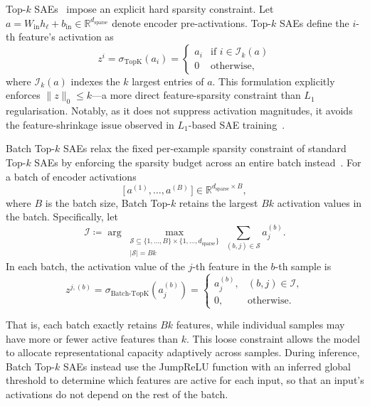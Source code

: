 \begin{definitionbox}
Top-$k$ SAEs~ impose an explicit hard sparsity constraint. Let $a = W_{\text{in}} h_\ell + b_{\text{in}} \in \mathbb{R}^{d_{\text{sparse}}}$ denote encoder pre-activations. Top-$k$ SAEs define the $i$-th feature's activation as
\[
z^i = \sigma_{\text{TopK}}(a_i) = \begin{cases}
a_i & \text{if } i \in \mathcal{I}_k(a) \\
0 & \text{otherwise},
\end{cases}
\]
where $\mathcal{I}_k(a)$ indexes the $k$ largest entries of $a$. This formulation explicitly enforces $\|z\|_0 \le k$---a more direct feature-sparsity constraint than $L_1$ regularisation. Notably, as it does not suppress activation magnitudes, it avoids the feature-shrinkage issue observed in $L_1$-based SAE training~.
\end{definitionbox}

\begin{definitionbox}

Batch Top-$k$ SAEs relax the fixed per-example sparsity constraint of standard Top-$k$ SAEs by enforcing the sparsity budget across an entire batch instead~. For a batch of encoder activations
\[
\big[\, a^{(1)}, \dots, a^{(B)} \,\big] \in \mathbb{R}^{d_{\text{sparse}} \times B},
\]
where $B$ is the batch size, Batch Top-$k$ retains the largest $Bk$ activation values in the batch. Specifically, let
\[
\mathcal{I}
\coloneqq
\arg\max_{\substack{
\mathcal{S}\subseteq
\{1,\ldots,B\}\times
\{1,\ldots,d_{\text{sparse}}\}\\
|\mathcal{S}|=Bk
}}
\sum_{(b,j)\in\mathcal{S}}
a_j^{(b)}.
\]
In each batch, the activation value of the $j$-th feature in the $b$-th sample is
\[
z^{j, (b)}
=
\sigma_{\text{Batch-TopK}}\!\left(a_j^{(b)}\right)
=
\begin{cases}
a_j^{(b)}, & (b,j)\in\mathcal{I},\\
0, & \text{otherwise}.
\end{cases}
\]

That is, each batch exactly retains $Bk$ features, while individual samples may have more or fewer active features than $k$. This loose constraint allows the model to allocate representational capacity adaptively across samples. During inference, Batch Top-$k$ SAEs instead use the JumpReLU function with an inferred global threshold to determine which features are active for each input, so that an input's activations do not depend on the rest of the batch.
\end{definitionbox}


